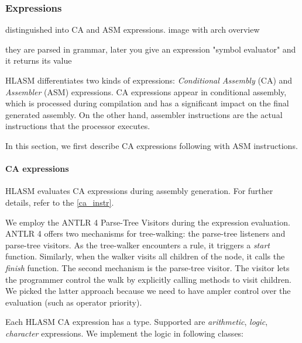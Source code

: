 \subsubsection{Expressions}

distinguished into CA and ASM expressions. 
image with arch
overview

they are parsed in grammar, later you give an expression "symbol evaluator" and it returns its value

HLASM differentiates two kinds of expressions: \emph{Conditional Assembly} (CA) and \emph{Assembler} (ASM) expressions. CA expressions appear in conditional assembly, which is processed during compilation and has a significant impact on the final generated assembly.
On the other hand, assembler instructions are the actual instructions that the processor executes.

In this section, we first describe CA expressions following with ASM instructions.

\paragraph{CA expressions}
HLASM evaluates CA expressions during assembly generation. For further details, refer to the \cref{ca_instr}.

We employ the ANTLR 4 Parse-Tree Visitors during the expression evaluation. ANTLR 4 offers two mechanisms for tree-walking: the parse-tree listeners and parse-tree visitors. As the tree-walker encounters a rule, it triggers a \emph{start} function. Similarly, when the walker visits all children of the node, it calls the \emph{finish} function.  The second mechanism is the parse-tree visitor. The visitor lets the programmer control the walk by explicitly calling methods to visit children. We picked the latter approach because we need to have ampler control over the evaluation (such as operator priority).

Each HLASM CA expression has a type. Supported are \emph{arithmetic}, \emph{logic}, \emph{character} expressions. We implement the logic in following classes:

